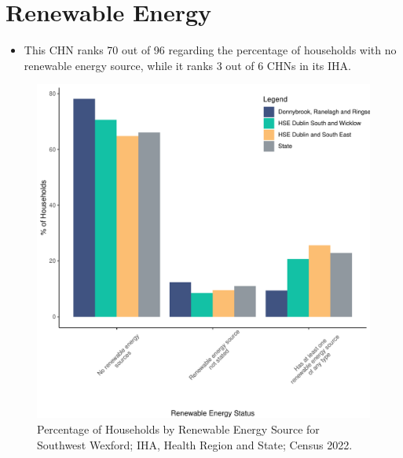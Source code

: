 \documentclass{article}
\begin{document}
\section{Renewable Energy}\label{sect:RE}
\begin{itemize}
\item This CHN ranks  70 out of 96 regarding the percentage of households with no renewable energy source, while it ranks   3 out of 6 CHNs in its IHA.
\end{itemize}
\begin{figure}[H]
	\centering
	\includegraphics[width = 140mm]{../figures/RenewableEnergyED.pdf}
	\caption{Percentage of Households by Renewable Energy Source for Southwest Wexford; IHA, Health Region and State; Census 2022.}
	\label{fig:vbnv}
	\end{figure}
\end{document}
